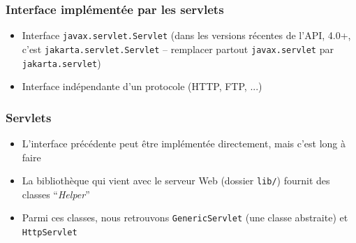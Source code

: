 \documentclass{beamer}
\begin{document}
\begin{frame}
  \frametitle{Interface implémentée par les servlets}
      \begin{itemize}
      \item Interface \texttt{javax.servlet.Servlet} (dans les versions récentes de l'API, 4.0+, c'est \texttt{jakarta.servlet.Servlet} -- remplacer partout \texttt{javax.servlet} par \texttt{jakarta.servlet})
      \vspace{4.5cm}
    \item Interface indépendante d'un protocole (HTTP, FTP, ...)
      \end{itemize}
\end{frame}

\begin{frame}
  \frametitle{Servlets}  
  \begin{itemize}
  \item L'interface précédente peut être implémentée directement, mais
    c'est long à faire
  \item La bibliothèque qui vient avec le serveur Web (dossier
    \texttt{lib/}) fournit des classes ``\textit{Helper}''
  \item Parmi ces classes, nous retrouvons \texttt{GenericServlet}
    (une classe abstraite) et \texttt{HttpServlet}
  \end{itemize}
\end{frame}
\end{document}
